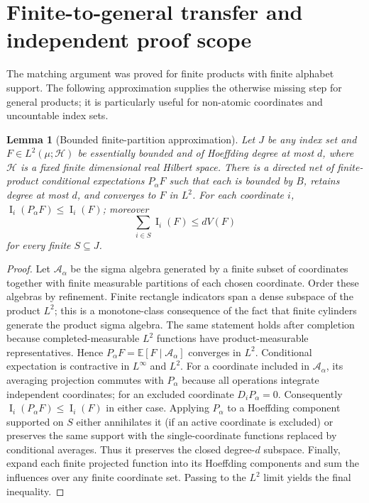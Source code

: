 \documentclass[11pt,letterpaper]{article}
\newtheorem{lemma}[theorem]{Lemma}
\theoremstyle{definition}
\newcommand{\E}{\mathbb E}
\newcommand{\Inf}{\operatorname{I}}
\newcommand{\cH}{\mathcal H}
\begin{document}
\section{Finite-to-general transfer and independent proof scope}\label{sec:lift}
The matching argument was proved for finite products with finite
alphabet support. The following approximation supplies the otherwise
missing step for general products; it is particularly useful for
non-atomic coordinates and uncountable index sets.

\begin{lemma}[Bounded finite-partition approximation]\label{lem:lift}
Let $J$ be any index set and $F\in L^2(\mu;\cH)$ be essentially bounded
and of Hoeffding degree at most $d$, where $\cH$ is a fixed finite
dimensional real Hilbert space. There is a directed net of finite-product
conditional expectations $P_\alpha F$ such that each is bounded by
$B$, retains degree at most $d$, and converges to $F$ in $L^2$.
For each coordinate $i$, $\Inf_i(P_\alpha F)\le\Inf_i(F)$; moreover
\[\sum_{i\in S}\Inf_i(F)\le dV(F)\]
for every finite $S\subseteq J$.
\end{lemma}
\begin{proof}
Let $\mathcal A_\alpha$ be the sigma algebra generated by a finite
subset of coordinates together with finite measurable partitions of
each chosen coordinate. Order these algebras by refinement. Finite
rectangle indicators span a dense subspace of the product $L^2$; this
is a monotone-class consequence of the fact that finite cylinders
generate the product sigma algebra. The same statement holds after
completion because completed-measurable $L^2$ functions have
product-measurable representatives. Hence $P_\alpha F
=\E[F\mid\mathcal A_\alpha]$ converges in $L^2$.
Conditional expectation is contractive in $L^\infty$ and $L^2$.
For a coordinate included in $\mathcal A_\alpha$, its averaging
projection commutes with $P_\alpha$ because all operations integrate
independent coordinates; for an excluded coordinate $D_iP_\alpha=0$.
Consequently $\Inf_i(P_\alpha F)\le\Inf_i(F)$ in either case.
Applying $P_\alpha$ to a Hoeffding component supported on $S$ either
annihilates it (if an active coordinate is excluded) or preserves the
same support with the single-coordinate functions replaced by
conditional averages. Thus it preserves the closed degree-$d$
subspace. Finally, expand each finite projected function into its
Hoeffding components and sum the influences over any finite coordinate
set. Passing to the $L^2$ limit yields the final inequality.
\end{proof}
\end{document}
